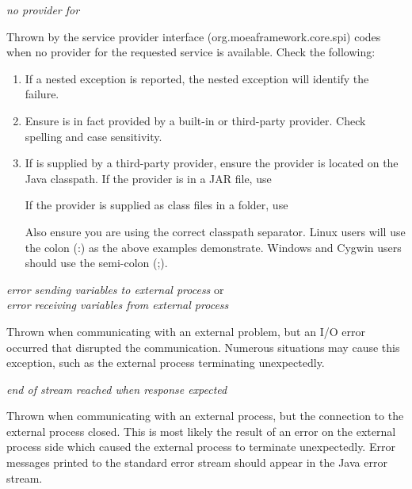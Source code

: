 \noindent
\textit{no provider for }
\begin{indented}
  Thrown by the service provider interface (org.moeaframework.core.spi) codes when no provider for the requested service is available.  Check the following:
  \begin{enumerate}
    \item If a nested exception is reported, the nested exception will identify the failure.
    \item Ensure  is in fact provided by a built-in or third-party provider. Check spelling and case sensitivity.
    \item If  is supplied by a third-party provider, ensure the provider is located on the Java classpath.  If the provider is in a JAR file, use
      \begin{indented}
      \end{indented}
      If the provider is supplied as class files in a folder, use
      \begin{indented}
      \end{indented}
      Also ensure you are using the correct classpath separator.  Linux users will use the colon (:) as the above examples demonstrate.  Windows and Cygwin users should use the
      semi-colon (;).
  \end{enumerate}
\end{indented}

\noindent
\textit{error sending variables to external process} or\\
\textit{error receiving variables from external process}
\begin{indented}
  Thrown when communicating with an external problem, but an I/O error occurred that disrupted the communication.  Numerous situations may cause this exception, such as the external process terminating unexpectedly.
\end{indented}

\noindent
\textit{end of stream reached when response expected}
\begin{indented}
  Thrown when communicating with an external process, but the connection to the external process closed.  This is most likely the result of an error on the external process side which caused the external process to terminate unexpectedly.  Error messages printed to the standard error stream should appear in the Java error stream.
\end{indented}

